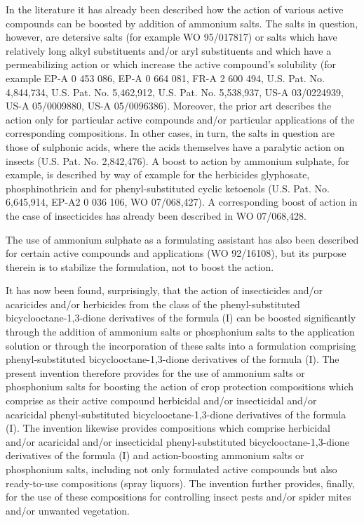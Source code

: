 \documentclass[11pt,a4paper]{article}
\begin{document}
In the literature it has already been described how the action of various active compounds can be boosted by addition of ammonium salts. The salts in question, however, are detersive salts (for example WO 95/017817) or salts which have relatively long alkyl substituents and/or aryl substituents and which have a permeabilizing action or which increase the active compound's solubility (for example EP-A 0 453 086, EP-A 0 664 081, FR-A 2 600 494, U.S. Pat. No. 4,844,734, U.S. Pat. No. 5,462,912, U.S. Pat. No. 5,538,937, US-A 03/0224939, US-A 05/0009880, US-A 05/0096386). Moreover, the prior art describes the action only for particular active compounds and/or particular applications of the corresponding compositions. In other cases, in turn, the salts in question are those of sulphonic acids, where the acids themselves have a paralytic action on insects (U.S. Pat. No. 2,842,476). A boost to action by ammonium sulphate, for example, is described by way of example for the herbicides glyphosate, phosphinothricin and for phenyl-substituted cyclic ketoenols (U.S. Pat. No. 6,645,914, EP-A2 0 036 106, WO 07/068,427). A corresponding boost of action in the case of insecticides has already been described in WO 07/068,428.

The use of ammonium sulphate as a formulating assistant has also been described for certain active compounds and applications (WO 92/16108), but its purpose therein is to stabilize the formulation, not to boost the action.

It has now been found, surprisingly, that the action of insecticides and/or acaricides and/or herbicides from the class of the phenyl-substituted bicyclooctane-1,3-dione derivatives of the formula (I) can be boosted significantly through the addition of ammonium salts or phosphonium salts to the application solution or through the incorporation of these salts into a formulation comprising phenyl-substituted bicyclooctane-1,3-dione derivatives of the formula (I). The present invention therefore provides for the use of ammonium salts or phosphonium salts for boosting the action of crop protection compositions which comprise as their active compound herbicidal and/or insecticidal and/or acaricidal phenyl-substituted bicyclooctane-1,3-dione derivatives of the formula (I). The invention likewise provides compositions which comprise herbicidal and/or acaricidal and/or insecticidal phenyl-substituted bicyclooctane-1,3-dione derivatives of the formula (I) and action-boosting ammonium salts or phosphonium salts, including not only formulated active compounds but also ready-to-use compositions (spray liquors). The invention further provides, finally, for the use of these compositions for controlling insect pests and/or spider mites and/or unwanted vegetation.
\end{document}
